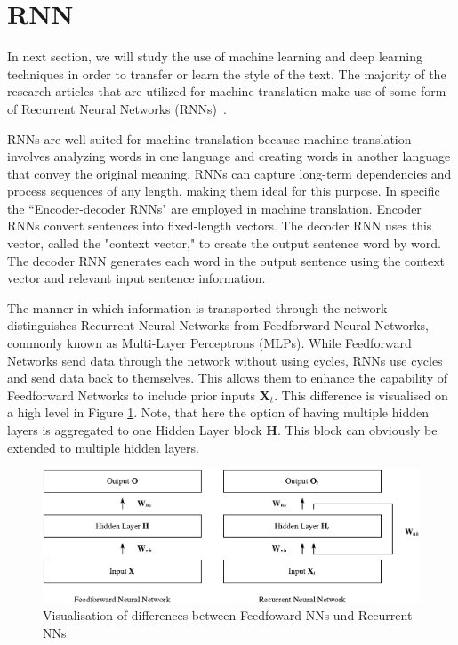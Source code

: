 \documentclass[akbc,twoside,11pt]{article}
\begin{document}
\section{RNN}\label{sec:rnn}

In next section, we will study the use of machine learning and deep learning techniques in order to transfer or learn the style of the text. The majority of the research articles that are utilized for machine translation make use of some form of Recurrent Neural Networks (RNNs)~\cite{schmidt2019recurrent}. 

RNNs are well suited for machine translation because machine translation involves analyzing words in one language and creating words in another language that convey the original meaning. RNNs can capture long-term dependencies and process sequences of any length, making them ideal for this purpose. In specific the ``Encoder-decoder RNNs" are employed in machine translation. Encoder RNNs convert sentences into fixed-length vectors. The decoder RNN uses this vector, called the "context vector," to create the output sentence word by word. The decoder RNN generates each word in the output sentence using the context vector and relevant input sentence information.

The manner in which information is transported through the network distinguishes Recurrent Neural Networks from Feedforward Neural Networks, commonly known as Multi-Layer Perceptrons (MLPs). While Feedforward Networks send data through the network without using cycles, RNNs use cycles and send data back to themselves. This allows them to enhance the capability of Feedforward Networks to include prior inputs $\mathbf{X}_t$. This difference is visualised on a high level in Figure \ref{fig:rnn}. Note, that here the option of having multiple hidden layers is aggregated to one Hidden Layer block $\mathbf{H}$. This block can obviously be extended to multiple hidden layers.

\begin{figure}
    \centering
    \includegraphics[width=\textwidth]{assets/rnn-cropped.pdf}
    \caption{Visualisation of differences between Feedfoward NNs und Recurrent NNs~\cite{schmidt2019recurrent}}
    \label{fig:rnn}
\end{figure}
\end{document}
